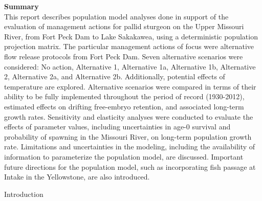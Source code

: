 \documentclass[12pt]{article}
\begin{document}
{\Large {\bf Summary}}\\
This report describes population model analyses done in support of the evaluation of management actions for pallid sturgeon on the Upper Missouri River, from Fort Peck Dam to Lake Sakakawea, using a deterministic population projection matrix.  The particular management actions of focus were alternative flow release protocols from Fort Peck Dam.  Seven alternative scenarios were considered:  No action, Alternative 1, Alternative 1a, Alternative 1b, Alternative 2, Alternative 2a, and Alternative 2b.  Additionally, potential effects of temperature are explored.   Alternative scenarios were compared in terms of their ability to be fully implemented throughout the period of record (1930-2012), estimated effects on drifting free-embryo retention, and associated long-term growth rates.  Sensitivity and elasticity analyses were conducted to evaluate the effects of parameter values, including uncertainties in age-0 survival and probability of spawning in the Missouri River, on long-term population growth rate. Limitations and uncertainties in the modeling, including the availability of information to parameterize the population model, are discussed.  Important future directions for the population model, such as incorporating fish passage at Intake in the Yellowstone, are also introduced.  

\begin{section}{Introduction}
\end{section}
\end{document}
